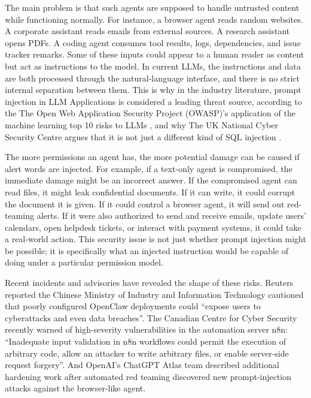 \documentclass[11pt,a4paper]{report}
\begin{document}
The main problem is that such agents are supposed to handle untrusted content while functioning normally. For instance, a browser agent reads random websites. A corporate assistant reads emails from external sources. A research assistant opens PDFs. A coding agent consumes tool results, logs, dependencies, and issue tracker remarks. Some of these inputs could appear to a human reader as content but act as instructions to the model. In current LLMs, the instructions and data are both processed through the natural-language interface, and there is no strict internal separation between them. This is why in the industry literature, prompt injection in LLM Applications is considered a leading threat source, according to the The Open Web Application Security Project (OWASP)'s application of the machine learning top 10 risks to LLMs \cite{owasp2025}, and why The UK National Cyber Security Centre argues that it is not just a different kind of SQL injection \cite{ncsc2025}.

The more permissions an agent has, the more potential damage can be caused if alert words are injected. For example, if a text-only agent is compromised, the immediate damage might be an incorrect answer. If the compromised agent can read files, it might leak confidential documents. If it can write, it could corrupt the document it is given. If it could control a browser agent, it will send out red-teaming alerts. If it were also authorized to send and receive emails, update users' calendars, open helpdesk tickets, or interact with payment systems, it could take a real-world action. This security issue is not just whether prompt injection might be possible; it is specifically what an injected instruction would be capable of doing under a particular permission model. 

Recent incidents and advisories have revealed the shape of these risks. Reuters reported the Chinese Ministry of Industry and Information Technology cautioned that poorly configured OpenClaw deployments could ``expose users to cyberattacks and even data breaches''. \cite{reutersOpenClaw2026} The Canadian Centre for Cyber Security recently warned of high-severity vulnerabilities in the automation server n8n: ``Inadequate input validation in n8n workflows could permit the execution of arbitrary code, allow an attacker to write arbitrary files, or enable server-side request forgery''\cite{canadaN8N2026}. And OpenAI's ChatGPT Atlas team described additional hardening work after automated red teaming discovered new prompt-injection attacks against the browser-like agent\cite{openaiAtlas2025}. 
\end{document}
